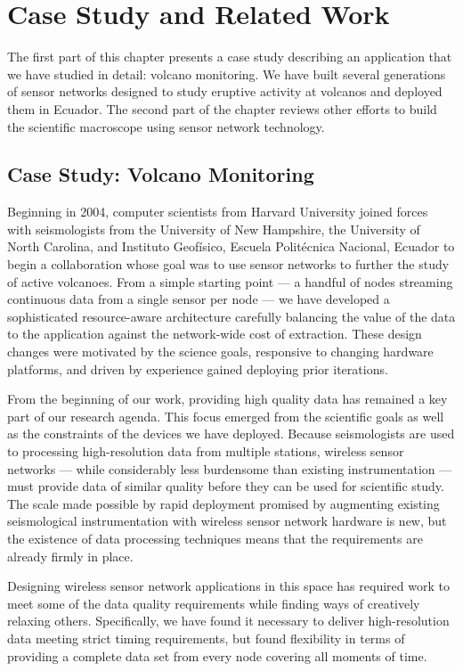 \chapter{Case Study and Related Work}
\label{chapter-related}

The first part of this chapter presents a case study describing an
application that we have studied in detail: volcano monitoring. We have built
several generations of sensor networks designed to study eruptive activity at
volcanos and deployed them in Ecuador. The second part of the chapter reviews
other efforts to build the scientific macroscope using sensor network
technology.

\section{Case Study: Volcano Monitoring}

Beginning in 2004, computer scientists from Harvard University joined forces
with seismologists from the University of New Hampshire, the University of
North Carolina, and Instituto Geof\'{i}sico, Escuela Polit\'{e}cnica
Nacional, Ecuador to begin a collaboration whose goal was to use sensor
networks to further the study of active volcanoes. From a simple starting
point --- a handful of nodes streaming continuous data from a single sensor
per node --- we have developed a sophisticated resource-aware architecture
carefully balancing the value of the data to the application against the
network-wide cost of extraction. These design changes were motivated by the
science goals, responsive to changing hardware platforms, and driven by
experience gained deploying prior iterations.

From the beginning of our work, providing high quality data has remained a
key part of our research agenda. This focus emerged from the scientific goals
as well as the constraints of the devices we have deployed. Because
seismologists are used to processing high-resolution data from multiple
stations, wireless sensor networks --- while considerably less burdensome
than existing instrumentation --- must provide data of similar quality before
they can be used for scientific study. The scale made possible by rapid
deployment promised by augmenting existing seismological instrumentation with
wireless sensor network hardware is new, but the existence of data processing
techniques means that the requirements are already firmly in place.

Designing wireless sensor network applications in this space has required
work to meet some of the data quality requirements while finding ways of
creatively relaxing others. Specifically, we have found it necessary to
deliver high-resolution data meeting strict timing requirements, but found
flexibility in terms of providing a complete data set from every node
covering all moments of time.

